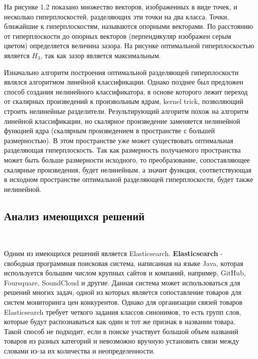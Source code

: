 На рисунке 1.2 показано множество векторов, изображенных в виде точек, и несколько гиперплоскостей, разделяющих эти точки на два класса. Точки, ближайшие к гиперплоскостям, называются опорными векторами. По расстоянию от гиперплоскости до опорных векторов (перпендикуляр изображен серым цветом) определяется величина зазора. На рисунке оптимальной гиперплоскостью является $H_{3}$, так как зазор является максимальным.

Изначально алгоритм построения оптимальной разделяющей гиперплоскости являлся алгоритмом линейной классификации. Однако позднее был предложен способ создания нелинейного классификатора, в основе которого лежит переход от скалярных произведений к произвольным ядрам, kernel trick, позволяющий строить нелинейные разделители. Результирующий алгоритм похож на алгоритм линейной классификации, но скалярное произведение заменяется нелинейной функцией ядра (скалярным произведением в пространстве с большей размерностью). В этом пространстве уже может существовать оптимальная разделяющая гиперплоскость. Так как размерность получаемого пространства может быть больше размерности исходного, то преобразование, сопоставляющее скалярные произведения, будет нелинейным, а значит функция, соответствующая в исходном пространстве оптимальной разделяющей гиперплоскости, будет также нелинейной.

\newpage
\subsection{Анализ имеющихся решений}
\

Одним из имеющихся решений является Elasticsearch. \textbf{Elasticsearch} - свободная программная поисковая система, написанная на языке Java, которая используется большим числом крупных сайтов и компаний, например, GitHub, Foursquare, SoundCloud и другие. Данная система может использоваться для решений многих задач, одной из которых является сопоставление товаров для систем мониторинга цен конкурентов.\cite{ELASTIC} Однако для организации связей товаров Elasticsearch требует четкого задания классов синонимов, то есть групп слов, которые будут распознаваться как один и тот же признак в названии товара. Такой способ не подходит, если в поиске участвует большой объем названий товаров из разных категорий и невозможно вручную установить связи между словами из-за их количества и неопределенности.

\newpage
